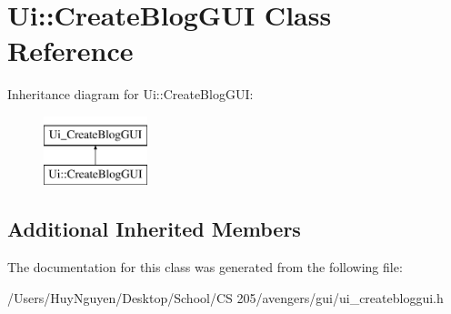 \hypertarget{classUi_1_1CreateBlogGUI}{}\section{Ui\+:\+:Create\+Blog\+G\+UI Class Reference}
\label{classUi_1_1CreateBlogGUI}
Inheritance diagram for Ui\+:\+:Create\+Blog\+G\+UI\+:\begin{figure}[H]
\begin{center}
\leavevmode
\includegraphics[height=2.000000cm]{classUi_1_1CreateBlogGUI}
\end{center}
\end{figure}
\subsection*{Additional Inherited Members}


The documentation for this class was generated from the following file\+:\begin{DoxyCompactItemize}
\item 
/\+Users/\+Huy\+Nguyen/\+Desktop/\+School/\+C\+S 205/avengers/gui/ui\+\_\+createbloggui.\+h\end{DoxyCompactItemize}
